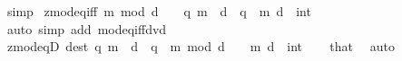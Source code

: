 \begin{isabellebody}
\endisadelimproof
%
\isatagproof
{}\isamarkupfalse%
\ simp%
\endisatagproof
{\isafoldproof}%
%
\isadelimproof
\isanewline
%
\endisadelimproof
\isanewline
{}\isamarkupfalse%
\ zmod{\isacharunderscore}{\kern0pt}eq{\isacharunderscore}{\kern0pt}{}{\isacharunderscore}{\kern0pt}iff{\isacharcolon}{\kern0pt}\ {\isachardoublequoteopen}m\ mod\ d\ {\isacharequal}{\kern0pt}\ {}\ {\isasymlongleftrightarrow}\ {\isacharparenleft}{\kern0pt}{\isasymexists}q{\isachardot}{\kern0pt}\ m\ {\isacharequal}{\kern0pt}\ d\ {\isacharasterisk}{\kern0pt}\ q{\isacharparenright}{\kern0pt}{\isachardoublequoteclose}\ \ m\ d\ {\isacharcolon}{\kern0pt}{\isacharcolon}{\kern0pt}\ int\isanewline
%
\isadelimproof
\ \ %
\endisadelimproof
%
\isatagproof
{}\isamarkupfalse%
\ {\isacharparenleft}{\kern0pt}auto\ simp\ add{\isacharcolon}{\kern0pt}\ mod{\isacharunderscore}{\kern0pt}eq{\isacharunderscore}{\kern0pt}{}{\isacharunderscore}{\kern0pt}iff{\isacharunderscore}{\kern0pt}dvd{\isacharparenright}{\kern0pt}%
\endisatagproof
{\isafoldproof}%
%
\isadelimproof
\isanewline
%
\endisadelimproof
\isanewline
\isanewline
{}\isamarkupfalse%
\ zmod{\isacharunderscore}{\kern0pt}eq{\isacharunderscore}{\kern0pt}{}D\ {\isacharbrackleft}{\kern0pt}dest{\isacharbang}{\kern0pt}{\isacharbrackright}{\kern0pt}{\isacharcolon}{\kern0pt}\ {\isachardoublequoteopen}{\isasymexists}q{\isachardot}{\kern0pt}\ m\ {\isacharequal}{\kern0pt}\ d\ {\isacharasterisk}{\kern0pt}\ q{\isachardoublequoteclose}\ \ {\isachardoublequoteopen}m\ mod\ d\ {\isacharequal}{\kern0pt}\ {}{\isachardoublequoteclose}\ \ m\ d\ {\isacharcolon}{\kern0pt}{\isacharcolon}{\kern0pt}\ int\isanewline
%
\isadelimproof
\ \ %
\endisadelimproof
%
\isatagproof
{}\isamarkupfalse%
\ that\ \isamarkupfalse%
\ auto%
\endisatagproof
{\isafoldproof}%
%
\isadelimproof
\isanewline
%
\endisadelimproof
%
\isadelimtheory
\isanewline
%
\endisadelimtheory
%
\isatagtheory
{}\isamarkupfalse%
%
\endisatagtheory
{\isafoldtheory}%
%
\isadelimtheory
%
\endisadelimtheory
%
\end{isabellebody}%
\endinput
